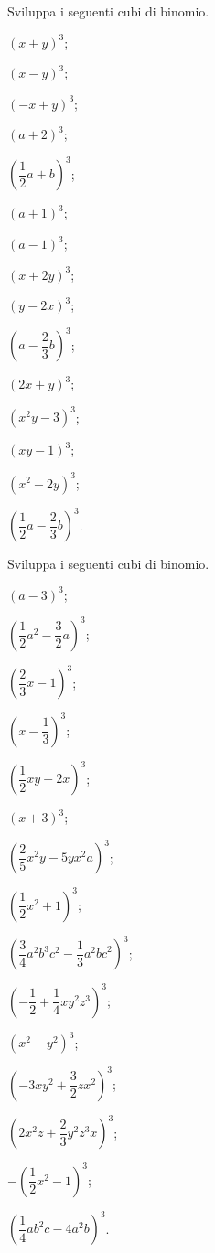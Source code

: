 \begin{esercizio}
 \label{ese:11.26}
 Sviluppa i seguenti cubi di binomio.
\begin{multicols}{3}
 \begin{enumeratea}
 \item $\left(x+y\right)^{3}$;
 \item $\left(x-y\right)^{3}$;
 \item $\left(-x+y\right)^{3}$;
 \item $\left(a+2\right)^{3}$;
 \item $\left(\dfrac{1}{2}a+b\right)^{3}$;
 \item $\left(a+1\right)^{3}$;
 \item $\left(a-1\right)^{3}$;
 \item $\left(x+2y\right)^{3}$;
 \item $\left(y-2x\right)^{3}$;
 \item $\left(a-\dfrac{2}{3}b\right)^{3}$;
 \item $\left(2x+y\right)^{3}$;
 \item $\left(x^{2}y-3\right)^{3}$;
 \item $\left(xy-1\right)^{3}$;
 \item $\left(x^{2}-2y\right)^{3}$;
 \item $\left(\dfrac{1}{2}a-\dfrac{2}{3}b\right)^{3}$.
 \end{enumeratea}
\end{multicols}
\end{esercizio}

\begin{esercizio}
 \label{ese:11.27}
 Sviluppa i seguenti cubi di binomio.
\begin{multicols}{3}
 \begin{enumeratea}
 \spazielenx
 \item $(a-3)^{3}$;
 \item $\left(\dfrac{1}{2}a^{2}-\dfrac{3}{2}a\right)^{3}$;
 \item $\left(\dfrac{2}{3}x-1\right)^{3}$;
 \item $\left(x-\dfrac{1}{3}\right)^{3}$;
 \item $\left(\dfrac{1}{2}{xy}-2x\right)^{3}$;
 \item $(x+3)^{3}$;
 \item $\left(\dfrac{2}{5}x^{2}y-5yx^{2}a\right)^{3}$;
 \item $\left(\dfrac{1}{2}x^{2}+1\right)^{3}$;
 \item $\left(\dfrac{3}{4}a^{2}b^{3}c^{2}-\dfrac{1}{3}a^{2}{bc}^{2}\right)^{3}$;
 \item $\left(-{\dfrac{1}{2}}+\dfrac{1}{4}{xy}^{2}z^{3}\right)^{3}$;
 \item $\left(x^{2}-y^{2}\right)^{3}$;
 \item $\left(-3xy^{2}+\dfrac{3}{2}zx^{2}\right)^{3}$;
 \item $\left(2x^{2}z+\dfrac{2}{3}y^{2}z^{3}x\right)^{3}$;
 \item $-\left(\dfrac{1}{2}x^{2}-1\right)^{3}$;
 \item $\left(\dfrac{1}{4}ab^{2}c-4a^{2}b\right)^{3}$.
 \end{enumeratea}
\end{multicols}
 \end{esercizio}

